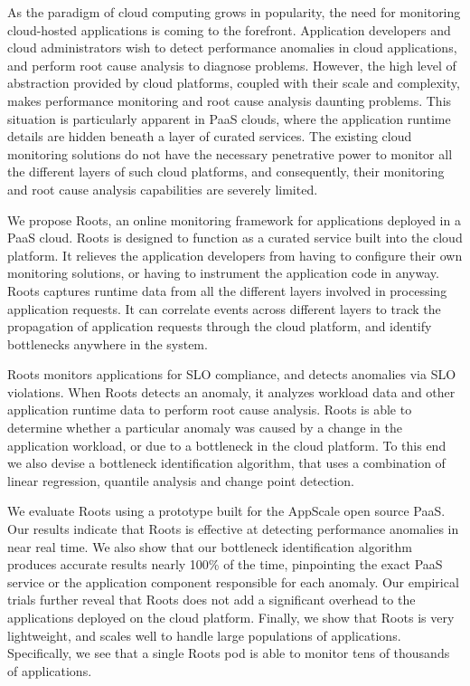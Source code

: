 As the paradigm of cloud computing grows in popularity, the need for monitoring cloud-hosted 
applications is coming to the forefront. Application developers and cloud administrators
wish to detect performance anomalies in cloud applications, and
perform root cause analysis to diagnose problems. However, the high level of abstraction provided by cloud
platforms, coupled with their scale and complexity, makes performance monitoring and
root cause analysis daunting problems. This situation is particularly apparent in
PaaS clouds, where the application runtime details are hidden beneath a layer of curated services.
The existing cloud monitoring solutions do not have the necessary penetrative power
to monitor all the different layers of such cloud platforms, and consequently, their monitoring
and root cause analysis capabilities are severely limited.

We propose Roots, an online monitoring framework for applications deployed in a PaaS cloud. 
Roots is designed to function as a curated service
built into the cloud platform. It relieves the application developers from having to configure
their own monitoring solutions, or having to instrument the application code in anyway.
Roots captures runtime data from all the different layers involved
in processing application requests. It can correlate events across different layers
to track the propagation of application requests through the cloud platform, and
identify bottlenecks anywhere in the system.

Roots monitors applications for SLO compliance, and detects anomalies via SLO violations.
When Roots detects an anomaly, 
it analyzes workload data and other application runtime data
to perform root cause analysis. Roots is able to determine whether a particular
anomaly was caused by a change in the application workload, or due to a bottleneck
in the cloud platform. To this end we also devise a bottleneck identification algorithm, that
uses a combination of linear regression, quantile analysis and change point detection.

We evaluate Roots using a prototype built for the AppScale open source PaaS. 
Our results indicate that Roots is effective at detecting performance anomalies
in near real time. We also show that our bottleneck identification algorithm
produces accurate results nearly 100\% of the time, pinpointing the exact PaaS
service or the application component responsible for each anomaly. Our empirical trials further 
reveal that Roots does not add a significant overhead to the applications deployed
on the cloud platform. Finally, we show that Roots is very lightweight, 
and scales well to handle large populations of applications. Specifically,
we see that a single Roots pod is able to monitor tens of thousands of applications.